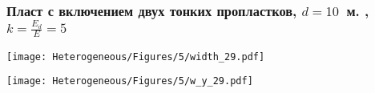 \begin{frame}
    \frametitle{Пласт с включением двух тонких пропластков, $d=10$~м. , $k=\frac{E_d}{E}=5$}
    \begin{minipage}[t]{0.4\linewidth}
        \texttt{[image: Heterogeneous/Figures/5/width\_29.pdf]}
    \end{minipage}
    \hfill
    \begin{minipage}[t]{0.57\linewidth}
        \texttt{[image: Heterogeneous/Figures/5/w\_y\_29.pdf]}
    \end{minipage}
\end{frame}